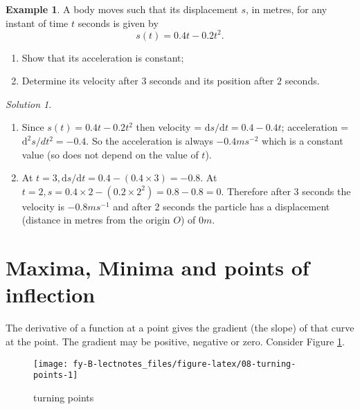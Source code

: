\documentclass[
  english,
  11pt,
  oneside]{book}
\providecommand{\tightlist}{%
  \setlength{\itemsep}{0pt}\setlength{\parskip}{0pt}}
\newcommand{\slide}{}
\theoremstyle{definition}
\theoremstyle{definition}
\newtheorem{example}{Example}[chapter]
\theoremstyle{definition}
\theoremstyle{definition}
\theoremstyle{remark}
\newtheorem*{solution}{Solution}
\begin{document}
\begin{example}

A body moves such that its displacement \(s\), in metres, for any instant of time \(t\) seconds is given by
\[
s(t) = 0.4t-0.2t^2.
\]

\begin{enumerate}
\def\labelenumi{\arabic{enumi}.}
\tightlist
\item
  Show that its acceleration is constant;
\item
  Determine its velocity after \(3\) seconds and its position after \(2\) seconds.
\end{enumerate}

\end{example}

\begin{solution}
\leavevmode

\begin{enumerate}
\def\labelenumi{\arabic{enumi}.}
\item
  Since \(s(t) = 0.4t-0.2t^2\) then velocity = \(\mathrm{d} s/\mathrm{d} t = 0.4-0.4t\); acceleration = \(\mathrm{d}^{2}s/dt^2 = -0.4\).
  So the acceleration is always \(-0.4ms^{-2}\) which is a constant value (so does not depend on the value of \(t\)).
\item
  At \(t=3, \mathrm{d} s/\mathrm{d} t = 0.4-(0.4\times 3) = -0.8\). At \(t=2, s = 0.4\times2-(0.2\times 2^2) = 0.8-0.8 = 0\). Therefore after \(3\) seconds the velocity is \(-0.8ms^{-1}\) and after 2 seconds the particle has a displacement (distance in metres from the origin \(O\)) of \(0m\).
\end{enumerate}

\end{solution}

\slide

\section{Maxima, Minima and points of inflection}\label{lecture-eight}

The derivative of a function at a point gives the gradient (the slope) of that curve at the point. The gradient may be positive, negative or zero. Consider Figure \ref{fig:08-turning-points}.

\begin{figure}

{\centering \texttt{[image: fy-B-lectnotes\_files/figure-latex/08-turning-points-1]} 

}

\caption{turning points}\label{fig:08-turning-points}
\end{figure}
\end{document}
